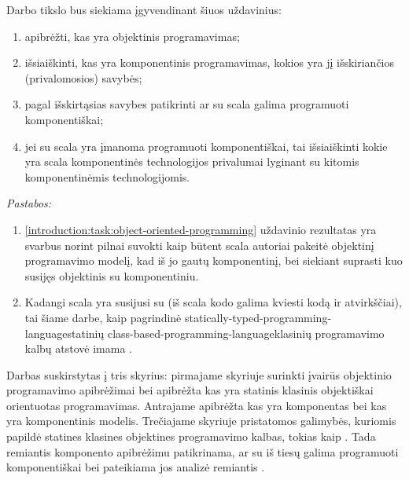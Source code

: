 Darbo tikslo bus siekiama įgyvendinant šiuos uždavinius:
\begin{enumerate}
  \item \label{introduction:task:object-oriented-programming}
    apibrėžti, kas yra objektinis programavimas;
  \item išsiaiškinti, kas yra komponentinis programavimas, kokios
    yra jį išskiriančios (privalomosios) savybės;
  \item pagal išskirtąsias savybes patikrinti ar su
    \gls{scala}{} galima programuoti komponentiškai;
  \item jei su \gls{scala}{} yra įmanoma programuoti
    komponentiškai, tai išsiaiškinti kokie yra
    \gls{scala}{} komponentinės technologijos
    privalumai lyginant su kitomis komponentinėmis technologijomis.
\end{enumerate}
\emph{Pastabos:}
\begin{enumerate}
  \item \ref{introduction:task:object-oriented-programming}
    uždavinio rezultatas yra svarbus norint pilnai suvokti kaip būtent
    \gls{scala}{} autoriai pakeitė objektinį programavimo
    modelį, kad iš jo gautų komponentinį, bei siekiant suprasti kuo
    susijęs objektinis su komponentiniu.
  \item Kadangi \gls{scala}{} yra susijusi su
     (iš \gls{scala}{} kodo galima
    kviesti  kodą ir atvirkščiai), tai šiame darbe,
    kaip pagrindinė \gls{statically-typed-programming-language}{statinių}
    \gls{class-based-programming-language}{klasinių}
     programavimo kalbų atstovė imama
    .
\end{enumerate}

Darbas suskirstytas į tris skyrius: pirmajame skyriuje surinkti
įvairūs objektinio programavimo apibrėžimai bei apibrėžta kas
yra statinis klasinis objektiškai orientuotas programavimas.
Antrajame apibrėžta kas yra komponentas bei kas yra komponentinis modelis.
Trečiajame skyriuje pristatomos galimybės, kuriomis 
papildė statines klasines objektines programavimo kalbas, tokias
kaip . Tada remiantis komponento apibrėžimu patikrinama, ar
su  iš tiesų galima programuoti
komponentiškai bei pateikiama jos analizė remiantis
\cite{classification-framework-for-scm}.
